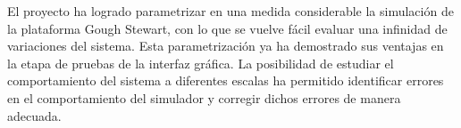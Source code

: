 
El proyecto ha logrado parametrizar 
en una medida considerable la simulación de la 
plataforma Gough Stewart, con lo que se vuelve fácil 
evaluar una infinidad de variaciones del sistema.
Esta parametrización ya ha demostrado sus ventajas 
en la etapa de pruebas de la interfaz gráfica.
La posibilidad de estudiar el comportamiento del
sistema a diferentes escalas ha permitido 
identificar errores en el comportamiento del 
simulador y corregir dichos errores de manera adecuada.

